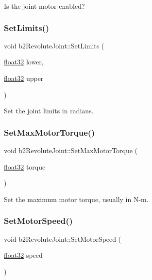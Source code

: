 Is the joint motor enabled? 

\mbox{\label{classb2_revolute_joint_a32f9393d8a6b993fd523f0f643c28107}} 
\subsubsection{\texorpdfstring{SetLimits()}{SetLimits()}}
{\footnotesize\ttfamily void b2\+Revolute\+Joint\+::\+Set\+Limits (\begin{DoxyParamCaption}\item[{\mbox{\hyperlink{b2_settings_8h_aacdc525d6f7bddb3ae95d5c311bd06a1}{float32}}}]{lower,  }\item[{\mbox{\hyperlink{b2_settings_8h_aacdc525d6f7bddb3ae95d5c311bd06a1}{float32}}}]{upper }\end{DoxyParamCaption})}



Set the joint limits in radians. 

\mbox{\label{classb2_revolute_joint_a41779d7ec05be33e6368ef00123a3581}} 
\subsubsection{\texorpdfstring{SetMaxMotorTorque()}{SetMaxMotorTorque()}}
{\footnotesize\ttfamily void b2\+Revolute\+Joint\+::\+Set\+Max\+Motor\+Torque (\begin{DoxyParamCaption}\item[{\mbox{\hyperlink{b2_settings_8h_aacdc525d6f7bddb3ae95d5c311bd06a1}{float32}}}]{torque }\end{DoxyParamCaption})}



Set the maximum motor torque, usually in N-\/m. 

\mbox{\label{classb2_revolute_joint_a56f60bb1ea69048c8a455da49d62bf65}} 
\subsubsection{\texorpdfstring{SetMotorSpeed()}{SetMotorSpeed()}}
{\footnotesize\ttfamily void b2\+Revolute\+Joint\+::\+Set\+Motor\+Speed (\begin{DoxyParamCaption}\item[{\mbox{\hyperlink{b2_settings_8h_aacdc525d6f7bddb3ae95d5c311bd06a1}{float32}}}]{speed }\end{DoxyParamCaption})}



